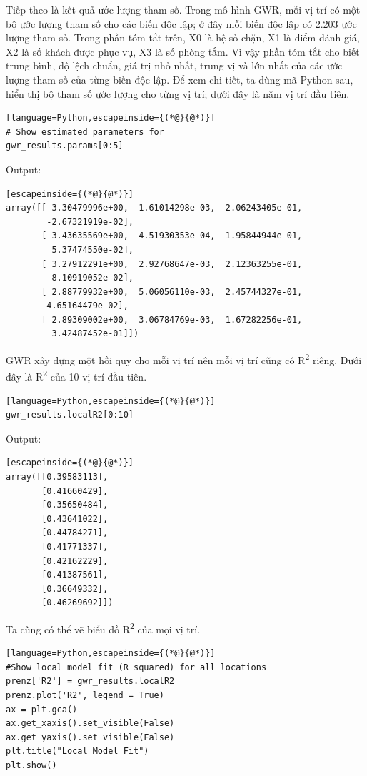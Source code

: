 Tiếp theo là kết quả ước lượng tham số. Trong mô hình GWR, mỗi vị trí có một bộ ước lượng tham số cho các biến độc lập; ở đây mỗi biến độc lập có 2.203 ước lượng tham số. Trong phần tóm tắt trên, X0 là hệ số chặn, X1 là điểm đánh giá, X2 là số khách được phục vụ, X3 là số phòng tắm. Vì vậy phần tóm tắt cho biết trung bình, độ lệch chuẩn, giá trị nhỏ nhất, trung vị và lớn nhất của các ước lượng tham số của từng biến độc lập. Để xem chi tiết, ta dùng mã Python sau, hiển thị bộ tham số ước lượng cho từng vị trí; dưới đây là năm vị trí đầu tiên.

\begin{lstlisting}[language=Python,escapeinside={(*@}{@*)}]
# Show estimated parameters for
gwr_results.params[0:5]
\end{lstlisting}

Output:

\begin{lstlisting}[escapeinside={(*@}{@*)}]
array([[ 3.30479996e+00,  1.61014298e-03,  2.06243405e-01,
        -2.67321919e-02],
       [ 3.43635569e+00, -4.51930353e-04,  1.95844944e-01,
         5.37474550e-02],
       [ 3.27912291e+00,  2.92768647e-03,  2.12363255e-01,
        -8.10919052e-02],
       [ 2.88779932e+00,  5.06056110e-03,  2.45744327e-01,
        4.65164479e-02],
       [ 2.89309002e+00,  3.06784769e-03,  1.67282256e-01,
         3.42487452e-01]])
\end{lstlisting}

GWR xây dựng một hồi quy cho mỗi vị trí nên mỗi vị trí cũng có R\textsuperscript{2} riêng. Dưới đây là R\textsuperscript{2} của 10 vị trí đầu tiên.

\begin{lstlisting}[language=Python,escapeinside={(*@}{@*)}]
gwr_results.localR2[0:10]
\end{lstlisting}

Output:

\begin{lstlisting}[escapeinside={(*@}{@*)}]
array([[0.39583113],
       [0.41660429],
       [0.35650484],
       [0.43641022],
       [0.44784271],
       [0.41771337],
       [0.42162229],
       [0.41387561],
       [0.36649332],
       [0.46269692]])
\end{lstlisting}

Ta cũng có thể vẽ biểu đồ R\textsuperscript{2} của mọi vị trí.

\begin{lstlisting}[language=Python,escapeinside={(*@}{@*)}]
#Show local model fit (R squared) for all locations
prenz['R2'] = gwr_results.localR2
prenz.plot('R2', legend = True)
ax = plt.gca()
ax.get_xaxis().set_visible(False)
ax.get_yaxis().set_visible(False)
plt.title("Local Model Fit")
plt.show()
\end{lstlisting}

